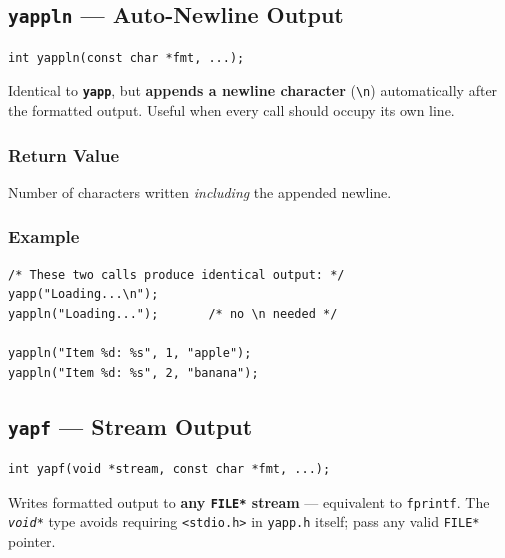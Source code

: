 \documentclass[11pt, a4paper]{article}
\newcommand{\fn}[1]{\texttt{\textbf{\textcolor{yapporange}{#1}}}}
\newcommand{\file}[1]{\texttt{#1}}
\newcommand{\type}[1]{\texttt{\textit{#1}}}
\begin{document}
\subsection{\fn{yappln} — Auto-Newline Output}

\begin{tcolorbox}[codebox]
\begin{lstlisting}
int yappln(const char *fmt, ...);
\end{lstlisting}
\end{tcolorbox}

Identical to \fn{yapp}, but \textbf{appends a newline character} (\texttt{\textbackslash n})
automatically after the formatted output. Useful when every call should occupy its own line.

\subsubsection*{Return Value}

Number of characters written \emph{including} the appended newline.

\subsubsection*{Example}

\begin{tcolorbox}[codebox]
\begin{lstlisting}
/* These two calls produce identical output: */
yapp("Loading...\n");
yappln("Loading...");       /* no \n needed */

yappln("Item %d: %s", 1, "apple");
yappln("Item %d: %s", 2, "banana");
\end{lstlisting}
\end{tcolorbox}

\subsection{\fn{yapf} — Stream Output}

\begin{tcolorbox}[codebox]
\begin{lstlisting}
int yapf(void *stream, const char *fmt, ...);
\end{lstlisting}
\end{tcolorbox}

Writes formatted output to \textbf{any \texttt{FILE*} stream} — equivalent to \texttt{fprintf}.
The \type{void*} type avoids requiring \texttt{<stdio.h>} in \file{yapp.h} itself; pass any
valid \texttt{FILE*} pointer.
\end{document}
